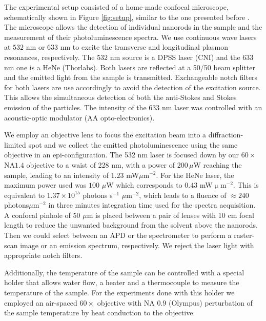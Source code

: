 \documentclass[journal=nalefd,manuscript=letter]{achemso}
\begin{document}
The experimental setup consisted of a home-made confocal microscope, schematically shown in Figure
\ref{fig:setup}, similar to the one presented before \cite{Carattino2016a}. The microscope allows 
the detection of individual nanorods in the sample and the measurement 
of their photoluminescence spectra. 
We use continuous wave lasers at $532$ nm or $633$ nm to excite the transverse 
and longitudinal plasmon resonances, respectively. The  $532$ nm source is a DPSS 
laser (CNI) and the 633 nm one is a HeNe (Thorlabs). Both lasers are reflected at
 a 50/50 beam splitter and the emitted light from the sample is transmitted. 
Exchangeable notch filters for both lasers are use accordingly to avoid the detection 
of the excitation source. This allows the simultaneous detection of both the anti-Stokes
 and Stokes emission of the particles. The intensity of the $633$ nm laser was 
controlled with an acoustic-optic modulator (AA opto-electronics).

We employ an objective lens to focus the excitation beam into a diffraction-limited 
spot and we collect the emitted photoluminescence using the same objective in an epi-configuration. 
The 532 nm laser is focused down by our $60\times$ NA$1.4$ objective to a waist of 228 nm, 
with a power of $200\, \mu$W reaching the sample, leading to an intensity of $1.23$ mW$\mu$m$^{-2}$. 
For the HeNe laser, the maximum power used was $100$ $\mu$W which 
corresponds to $0.43$ mW$\upmu$m$^{-2}$. This is equivalent to $1.37\times10^{15}$ 
photons s$^{-1}$ $\mu$m$^{-2}$, which leads to a fluence of $\approx 240$ photons$\mu$m$^{-2}$ 
in three minutes integration time used for the spectra acquisition. 
A confocal pinhole of 50 $\mu$m is placed between a pair of lenses with 10 cm focal length 
to reduce the unwanted background from the solvent above the nanorods. Then we could 
select between an APD or the spectrometer to perform a raster-scan image or an emission 
spectrum, respectively. We reject the laser light with appropriate notch filters.

Additionally, the temperature of the sample can be controlled with a special holder that allows 
water flow, a heater and a thermocouple to measure the temperature of the sample. 
For the experiments done with this holder we employed an air-spaced $60\times$ 
objective with NA $0.9$ (Olympus) perturbation of the sample temperature by heat 
conduction to the objective.
\end{document}
